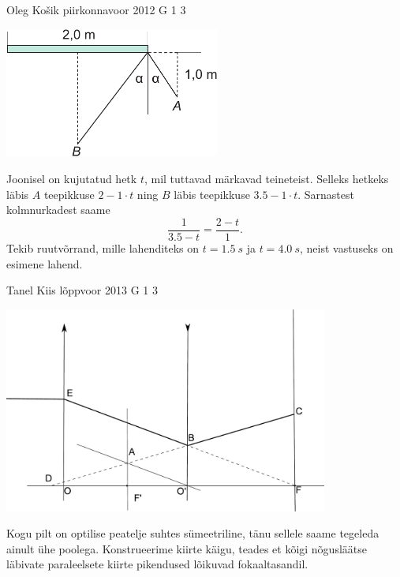 \documentclass[11pt]{article}
\begin{document}
{%
{Oleg Košik} %
{piirkonnavoor} %
{2012} %
{G 1} %
{3} %
{

\ifSolution
\begin{center}
\includegraphics[width=200pt]{2012-v2g-01-peegel_lah}
\end{center}

Joonisel on kujutatud hetk $t$, mil tuttavad märkavad teineteist. Selleks hetkeks läbis $A$ teepikkuse $2-1\cdot t$ ning $B$ läbis teepikkuse $\num{3,5}-1\cdot t$. Sarnastest kolmnurkadest saame
\[
\frac{1}{\num{3,5}-t}=\frac{2-t}{1}.
\]
Tekib ruutvõrrand, mille lahenditeks on $t=\SI{1,5}{s}$ ja $t=\SI{4,0}{s}$, neist vastuseks on esimene lahend.
\fi
}

{Tanel Kiis} %
{lõppvoor} %
{2013} %
{G 1} %
{3} %
{

\ifSolution
\begin{center}
	\includegraphics[width=0.8\textwidth]{2013-v3g-01-laats_lah2}\\
\end{center}
Kogu pilt on optilise peatelje suhtes sümeetriline, tänu sellele saame tegeleda ainult ühe poolega. Konstrueerime kiirte käigu, teades et kõigi nõgusläätse läbivate paraleelsete kiirte pikendused lõikuvad fokaaltasandil. 

}}
\end{document}
